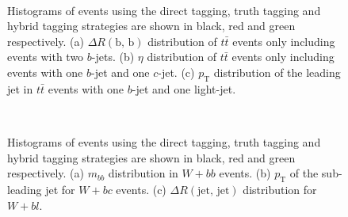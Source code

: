 \begin{figure}[ht]
  \centering
  \\
  \caption[A comparison of tagging strategies in $t\bar{t}$ events.]{Histograms of
    events using the direct tagging, truth tagging and hybrid tagging strategies
    are shown in black, red and green respectively. (a) $ \Delta R(\text{b, b})$
    distribution of $t\bar{t}$ events only including events with two $b$-jets. (b)
    $\eta$ distribution of $t\bar{t}$ events only including events with one
    $b$-jet and one $c$-jet. (c) $p_{\mathrm{T}}$ distribution of the leading jet in
    $t\bar{t}$ events with one $b$-jet and one light-jet.}
  \label{fig:truth_tag_validation_tt}
\end{figure}
\begin{figure}[ht]
  \centering
  \\
  \caption[A comparison of tagging strategie in W + jets events.]{Histograms of
    events using the direct tagging, truth tagging and hybrid tagging strategies
    are shown in black, red and green respectively. (a) $m_{bb}$ distribution in
    $W + bb$ events. (b) $p_{\mathrm{T}}$ of the sub-leading jet for $W + bc$ events. (c)
    $\Delta R(\text{jet, jet})$ distribution for $W + bl$.}
  \label{fig:truth_tag_validation_wjets}
\end{figure}